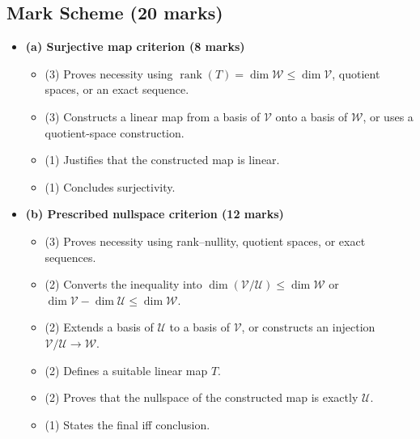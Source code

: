 \documentclass[12pt]{article}
\newcommand{\V}{\mathcal{V}}
\newcommand{\W}{\mathcal{W}}
\newcommand{\U}{\mathcal{U}}
\newcommand{\rank}{\operatorname{rank}}
\begin{document}
\subsection{Mark Scheme (20 marks)}
\begin{itemize}[leftmargin=1.6em]
  \item \textbf{(a) Surjective map criterion (8 marks)}
  \begin{itemize}[leftmargin=1.6em]
    \item (3) Proves necessity using $\rank(T)=\dim\W\le\dim\V$, quotient spaces, or an exact sequence.
    \item (3) Constructs a linear map from a basis of $\V$ onto a basis of $\W$, or uses a quotient-space construction.
    \item (1) Justifies that the constructed map is linear.
    \item (1) Concludes surjectivity.
  \end{itemize}
  \item \textbf{(b) Prescribed nullspace criterion (12 marks)}
  \begin{itemize}[leftmargin=1.6em]
    \item (3) Proves necessity using rank--nullity, quotient spaces, or exact sequences.
    \item (2) Converts the inequality into $\dim(\V/\U)\le\dim\W$ or $\dim\V-\dim\U\le\dim\W$.
    \item (2) Extends a basis of $\U$ to a basis of $\V$, or constructs an injection $\V/\U\to\W$.
    \item (2) Defines a suitable linear map $T$.
    \item (2) Proves that the nullspace of the constructed map is exactly $\U$.
    \item (1) States the final iff conclusion.
  \end{itemize}
\end{itemize}
\end{document}
